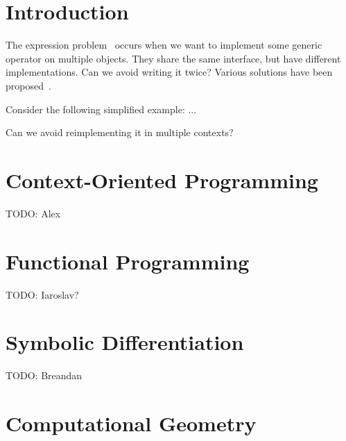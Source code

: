 \documentclass[sigconf]{acmart}
\begin{document}


\maketitle

\section{Introduction}


The expression problem~\citep{wadler1998expression} occurs when we want to implement some generic operator on multiple objects. They share the same interface, but have different implementations. Can we avoid writing it twice? Various solutions have been proposed~\citep{oliveira2012extensibility, oliveira2013feature, wang2016expression}.

Consider the following simplified example: ...

Can we avoid reimplementing it in multiple contexts?

\section{Context-Oriented Programming}

TODO: Alex

\section{Functional Programming}

TODO: Iaroslav?

\section{Symbolic Differentiation}

TODO: Breandan

\section{Computational Geometry}
\end{document}
